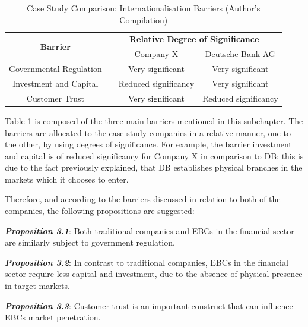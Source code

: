 \documentclass[11pt,a4paper]{article}
\begin{document}
{{{\vspace{8mm}
\begin{table}[H] \centering 
\begin{tabular}{c l c c}
    \toprule
    \multirow{2}{*}{\bfseries Barrier} & 
    \multicolumn{3}{c}{\bfseries Relative Degree of Significance}\\ \cmidrule(lr){3-4}
    && Company X&Deutsche Bank AG \\ \cmidrule(lr){1-4}
    Governmental Regulation&  & Very significant & Very significant \\
    Investment and Capital & & Reduced significancy  & Very significant\\
     Customer Trust &  & Very significant & Reduced significancy\\
    \bottomrule
\end{tabular}
\vspace{5mm}
\captionsetup{width=0.85\linewidth}
\caption{Case Study Comparison: Internationalisation Barriers (Author's Compilation)} 
\label{table:int_barriers_comp}
\end{table} 
\vspace{3mm}
Table \ref{table:int_barriers_comp} is composed of the three main barriers mentioned in this subchapter. The barriers are allocated to the case study companies in a relative manner, one to the other, by using degrees of significance. For example, the barrier investment and capital is of reduced significancy for Company X in comparison to DB; this is due to the fact previously explained, that DB establishes physical branches in the markets which it chooses to enter. \par
Therefore, and according to the barriers discussed in relation to both of the companies, the following propositions are suggested:

\begin{center}
\textbf{\textit{Proposition 3.1}}: Both traditional companies and EBCs in the financial sector are similarly subject to government regulation.
\end{center}
\begin{center}
\textbf{\textit{Proposition 3.2}}: In contrast to traditional companies, EBCs in the financial sector require less capital and investment, due to the absence of physical presence in target markets.
\end{center}
\begin{center}
\textbf{\textit{Proposition 3.3}}: Customer trust is an important construct that can influence EBCs market penetration.
\end{center}

}}}
\end{document}
